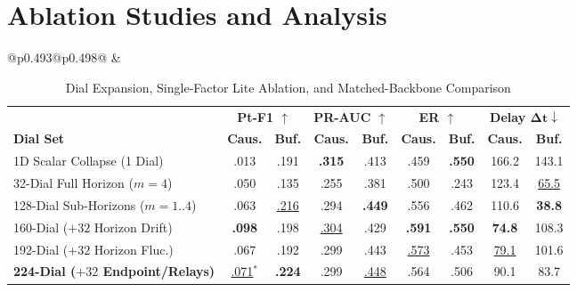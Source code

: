 \section{Ablation Studies and Analysis}
\label{sec:ablations}

\begin{table}[t]
\centering
\caption{Dial Expansion, Single-Factor Lite Ablation, and Matched-Backbone Comparison\label{tab:ablations}}
\vspace{1pt}
\begin{tabular}{@{}p{0.493\textwidth}@{\hspace{0.009\textwidth}}p{0.498\textwidth}@{}}
\toprule
{} &  \\
\cmidrule(r){1-1} \cmidrule(l){2-2}
\begingroup
\scriptsize
\renewcommand{\arraystretch}{0.95}
\setlength{\tabcolsep}{0.4pt}
\begin{tabular*}{\linewidth}{@{\extracolsep{\fill}}l cc cc cc cc@{}}
\toprule
& \multicolumn{2}{c}{\textbf{Pt-F1 $\uparrow$}} & \multicolumn{2}{c}{\textbf{PR-AUC $\uparrow$}} & \multicolumn{2}{c}{\textbf{ER $\uparrow$}} & \multicolumn{2}{c}{\textbf{Delay $\boldsymbol{\Delta t} \downarrow$}} \\
\cmidrule(lr){2-3} \cmidrule(lr){4-5} \cmidrule(lr){6-7} \cmidrule(lr){8-9}
\textbf{Dial Set} & \textbf{Caus.} & \textbf{Buf.} & \textbf{Caus.} & \textbf{Buf.} & \textbf{Caus.} & \textbf{Buf.} & \textbf{Caus.} & \textbf{Buf.} \\
\midrule
1D Scalar Collapse (1 Dial) & .013 & .191 & \textbf{.315} & .413 & .459 & \textbf{.550} & 166.2 & 143.1 \\
32-Dial Full Horizon ($m{=}4$) & .050 & .135 & .255 & .381 & .500 & .243 & 123.4 & \underline{65.5} \\
128-Dial Sub-Horizons ($m{=}1..4$) & .063 & \underline{.216} & .294 & \textbf{.449} & .556 & .462 & 110.6 & \textbf{38.8} \\
160-Dial ($+32$ Horizon Drift) & \textbf{.098} & .198 & \underline{.304} & .429 & \textbf{.591} & \textbf{.550} & \textbf{74.8} & 108.3 \\
192-Dial ($+32$ Horizon Fluc.) & .067 & .192 & .299 & .443 & \underline{.573} & .453 & \underline{79.1} & 101.6 \\
\textbf{224-Dial ($+32$ Endpoint/Relays)} & \underline{.071}$^*$ & \textbf{.224} & .299 & \underline{.448} & .564 & .506 & 90.1 & 83.7 \\

\end{tabular*}
\end{tabular}
\end{table}
